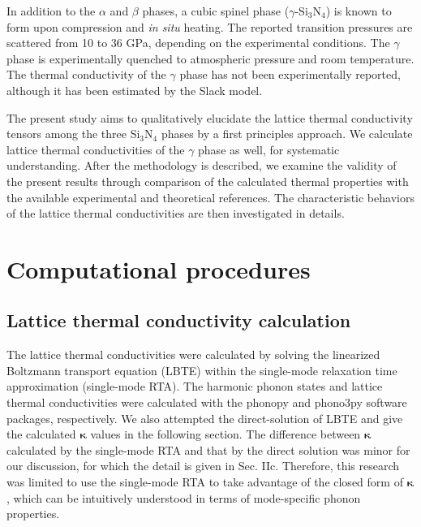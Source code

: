 \documentclass[twocolumn,amsmath,amssymb,a4paper,prb,superscriptaddress,floatfix]{revtex4-1}
\begin{document}
In addition to the $\alpha$ and $\beta$ phases, a cubic spinel phase
($\gamma$-Si$_3$N$_4$) is known to form upon compression and {\it{in
situ}} heating.\cite{zerr,zhang} The reported transition pressures are
scattered from 10 to 36 GPa, depending on the experimental
conditions.\cite{xu} The $\gamma$ phase is experimentally quenched to
atmospheric pressure and room temperature.  The thermal conductivity of
the $\gamma$ phase has not been experimentally reported, although it has
been estimated by the Slack model.\cite{morelli}

The present study aims to qualitatively elucidate the lattice thermal
conductivity tensors among the three Si$_3$N$_4$ phases by a first
principles approach.  We calculate lattice thermal conductivities of the
$\gamma$ phase as well, for systematic understanding. After the
methodology is described, we examine the validity of the present results
through comparison of the calculated thermal properties with the
available experimental and theoretical references.  The characteristic
behaviors of the lattice thermal conductivities are then investigated in
details.

\section{Computational procedures}

\subsection{Lattice thermal conductivity calculation}

The lattice thermal conductivities were calculated by solving the linearized
Boltzmann transport equation (LBTE) within the single-mode relaxation time
approximation (single-mode RTA).  The harmonic phonon states and lattice
thermal conductivities were calculated with the phonopy\cite{phonopy} and
phono3py\cite{phono3py} software packages, respectively.  We also attempted the
direct-solution of LBTE\cite{chaput-direct} and give the calculated
$\boldsymbol{\kappa}$ values in the following section. The difference between
$\boldsymbol{\kappa}$ calculated by the single-mode RTA and that by the direct
solution was minor for our discussion, for which the detail is given in Sec.
IIc. Therefore, this research was limited to use the single-mode RTA to take
advantage of the closed form of $\boldsymbol{\kappa}$, which can be intuitively
understood in terms of mode-specific phonon properties.
\end{document}

